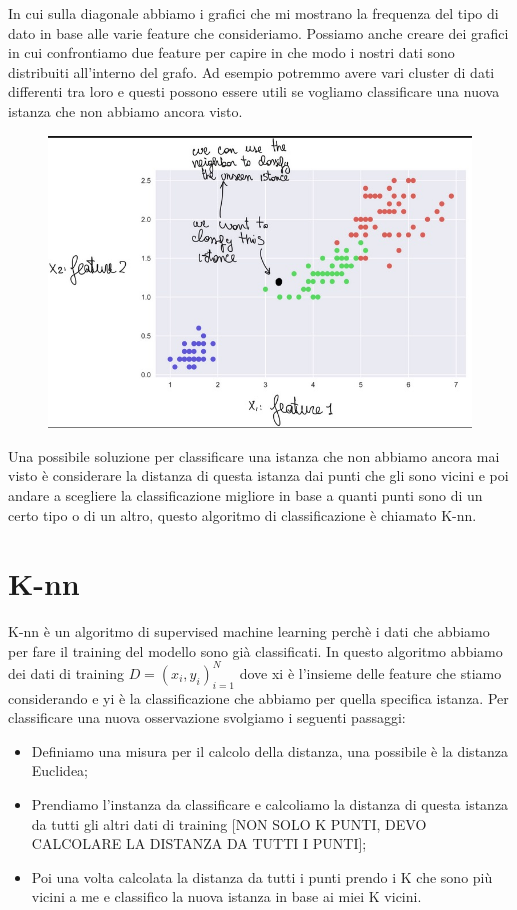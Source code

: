 \documentclass[14pt]{extreport}
\begin{document}
In cui sulla diagonale abbiamo i grafici che mi mostrano la frequenza del tipo di dato in base alle varie feature che consideriamo. Possiamo anche
creare dei grafici in cui confrontiamo due feature per capire in che modo i nostri dati sono distribuiti all’interno del grafo. Ad esempio potremmo
avere vari cluster di dati differenti tra loro e questi possono essere utili se vogliamo classificare una nuova istanza che non abbiamo ancora visto.


\begin{figure}[H]
\centering
\includegraphics[width=0.7\linewidth]{56.jpeg}
\end{figure}

Una possibile soluzione per classificare una istanza che non abbiamo ancora mai visto è considerare la distanza di questa istanza dai punti che gli
sono vicini e poi andare a scegliere la classificazione migliore in base a quanti punti sono di un certo tipo o di un altro, questo algoritmo di
classificazione è chiamato K-nn.

\section{K-nn}

K-nn è un algoritmo di supervised machine learning perchè i dati che abbiamo per fare il training del modello sono già classificati. In questo
algoritmo abbiamo dei dati di training $D = {(x_i, y_i)}^N_{i=1}$ dove xi è l’insieme delle feature che stiamo considerando e yi è la classificazione
che abbiamo per quella specifica istanza. 
Per classificare una nuova osservazione svolgiamo i seguenti passaggi: 
\begin{itemize}
	\item Definiamo una misura per il calcolo della distanza, una possibile è la distanza Euclidea; 
	\item Prendiamo l’instanza da classificare e calcoliamo la distanza di questa istanza da tutti gli altri dati di training [NON SOLO K PUNTI, DEVO CALCOLARE LA DISTANZA DA TUTTI I PUNTI]; 	
	\item Poi una volta calcolata la distanza da tutti i punti prendo i K che sono più vicini a me e classifico la nuova istanza in base ai miei K vicini.
\end{itemize} 
\end{document}
